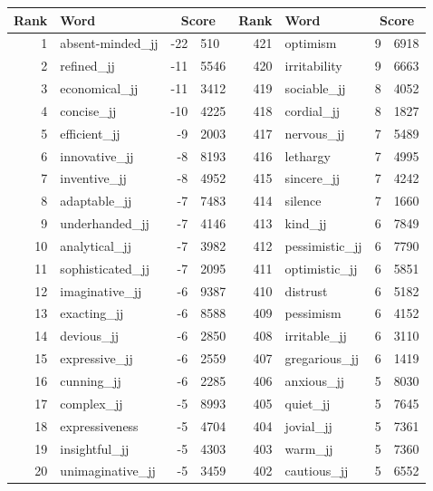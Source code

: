 \begin{table}[tbp]
    \begin{tabular}{| rlr@{.}l | rlr@{.}l |}
    \hline
    \textbf{Rank} & \textbf{Word} & \multicolumn{2}{c|}{\textbf{Score}} & \textbf{Rank} & \textbf{Word} & \multicolumn{2}{c|}{\textbf{Score}} \\
    \hline
    1 & absent-minded\_jj & -22 & 510    &    421 & optimism & 9 & 6918 \\
    2 & refined\_jj & -11 & 5546    &    420 & irritability & 9 & 6663 \\
    3 & economical\_jj & -11 & 3412    &    419 & sociable\_jj & 8 & 4052 \\
    4 & concise\_jj & -10 & 4225    &    418 & cordial\_jj & 8 & 1827 \\
    5 & efficient\_jj & -9 & 2003    &    417 & nervous\_jj & 7 & 5489 \\
    6 & innovative\_jj & -8 & 8193    &    416 & lethargy & 7 & 4995 \\
    7 & inventive\_jj & -8 & 4952    &    415 & sincere\_jj & 7 & 4242 \\
    8 & adaptable\_jj & -7 & 7483    &    414 & silence & 7 & 1660 \\
    9 & underhanded\_jj & -7 & 4146    &    413 & kind\_jj & 6 & 7849 \\
    10 & analytical\_jj & -7 & 3982    &    412 & pessimistic\_jj & 6 & 7790 \\
    11 & sophisticated\_jj & -7 & 2095    &    411 & optimistic\_jj & 6 & 5851 \\
    12 & imaginative\_jj & -6 & 9387    &    410 & distrust & 6 & 5182 \\
    13 & exacting\_jj & -6 & 8588    &    409 & pessimism & 6 & 4152 \\
    14 & devious\_jj & -6 & 2850    &    408 & irritable\_jj & 6 & 3110 \\
    15 & expressive\_jj & -6 & 2559    &    407 & gregarious\_jj & 6 & 1419 \\
    16 & cunning\_jj & -6 & 2285    &    406 & anxious\_jj & 5 & 8030 \\
    17 & complex\_jj & -5 & 8993    &    405 & quiet\_jj & 5 & 7645 \\
    18 & expressiveness & -5 & 4704    &    404 & jovial\_jj & 5 & 7361 \\
    19 & insightful\_jj & -5 & 4303    &    403 & warm\_jj & 5 & 7360 \\
    20 & unimaginative\_jj & -5 & 3459    &    402 & cautious\_jj & 5 & 6552 \\

\end{tabular}
\end{table}
